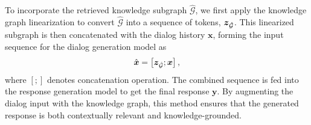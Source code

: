 \label{sec:3.3}
To incorporate the retrieved knowledge subgraph $\hat{\mathcal{G}}$, we first apply the knowledge graph linearization to convert $\hat{\mathcal{G}}$ into a sequence of tokens, $\boldsymbol{z}_{\hat{\mathcal{G}}}$.
This linearized subgraph is then concatenated with the dialog history $\boldsymbol{x}$, forming the input sequence for the dialog generation model as
\begin{equation}
    \hat{\boldsymbol{x}} = \left[\boldsymbol{z}_{\hat{\mathcal{G}}};\boldsymbol{x} \right],
\end{equation}
where $[;]$ denotes concatenation operation.
The combined sequence is fed into the response generation model to get the final response $\boldsymbol{y}$.
By augmenting the dialog input with the knowledge graph, this method ensures that the generated response is both contextually relevant and knowledge-grounded.
